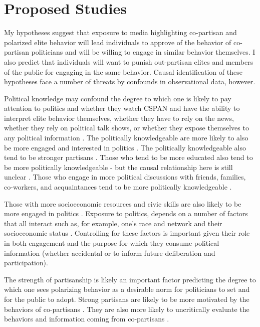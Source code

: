 \documentclass [12pt]{article}
\begin{document}
\section{Proposed Studies}

My hypotheses suggest that exposure to media highlighting co-partisan and polarized elite behavior will lead individuals to approve of the behavior of co-partisan politicians and will be willing to engage in similar behavior themselves. I also predict that individuals will want to punish out-partisan elites and members of the public for engaging in the same behavior. Causal identification of these hypotheses face a number of threats by confounds in observational data, however. 

Political knowledge may confound the degree to which one is likely to pay attention to politics and whether they watch CSPAN and have the ability to interpret elite behavior themselves, whether they have to rely on the news, whether they rely on political talk shows, or whether they expose themselves to any political information \citep{prior_2007}. The politically knowledgeable are more likely to also be more engaged and interested in politics \citep[see][]{delli-carpini_keeter_1996}. The politically knowledgeable also tend to be stronger partisans \citep{zaller_1992, taber_lodge_2006}. Those who tend to be more educated also tend to be more politically knowledgeable - but the causal relationship here is still unclear \citep{highton_2009}. Those who engage in more political discussions with friends, families, co-workers, and acquaintances tend to be more politically knowledgeable \citep{ognyanova_2020}. 

Those with more socioeconomic resources and civic skills are also likely to be more engaged in politics \citep{verba_et-al_1995}. Exposure to politics, depends on a number of factors that all interact such as, for example, one's race and network \citep{carlson_et-al_2020} and their socioeconomic status \citep{schlozman_verba_brady_2013}. Controlling for these factors is important given their role in both engagement and the purpose for which they consume political information (whether accidental or to inform future deliberation and participation).

The strength of partisanship is likely an important factor predicting the degree to which one sees polarizing behavior as a desirable norm for politicians to set and for the public to adopt. Strong partisans are likely to be more motivated by the behaviors of co-partisans \citep{mason_2015}. They are also more likely to uncritically evaluate the behaviors and information coming from co-partisans \citep{taber_lodge_2006}.  
\end{document}
